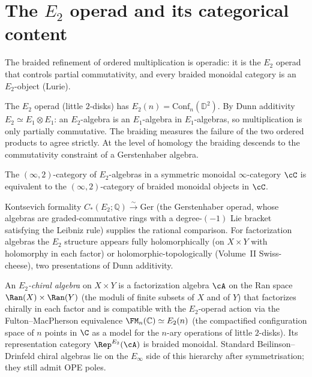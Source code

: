 \section{The \texorpdfstring{$E_2$}{E-2} operad and its categorical content}
\label{sec:e2-operad}

The braided refinement of ordered multiplication is operadic: it is
the $E_2$ operad that controls partial commutativity, and every
braided monoidal category is an $E_2$-object (Lurie).

\begin{definition}
\label{def:e2-operad}
The $E_2$ operad (little $2$-disks) has $E_2(n) =
\mathrm{Conf}_n(\mathbb{D}^2)$. By Dunn additivity $E_2 \simeq E_1
\otimes E_1$: an $E_2$-algebra is an $E_1$-algebra in $E_1$-algebras,
so multiplication is only partially commutative. The braiding measures
the failure of the two ordered products to agree strictly. At the level
of homology the braiding descends to the
commutativity constraint of a Gerstenhaber algebra.
\end{definition}

\begin{theorem}
\label{thm:lurie-e2-braided}
\ClaimStatusProvedElsewhere
The $(\infty,2)$-category of $E_2$-algebras in a symmetric monoidal
$\infty$-category $\cC$ is equivalent to the $(\infty,2)$-category of
braided monoidal objects in $\cC$.
\end{theorem}

Kontsevich formality $C_*(E_2;\mathbb{Q}) \xrightarrow{\sim}
\mathrm{Ger}$ \textup{(}the Gerstenhaber operad, whose algebras are
graded-commutative rings with a degree-$(-1)$ Lie bracket satisfying
the Leibniz rule\textup{)} supplies the rational comparison.
For factorization algebras the $E_2$ structure appears fully
holomorphically \textup{(}on $X \times Y$ with holomorphy in each
factor\textup{)} or holomorphic-topologically \textup{(}Volume~II
Swiss-cheese\textup{),} two presentations of Dunn additivity.

\begin{definition}
\label{def:e2-chiral-algebra}
An \emph{$E_2$-chiral algebra} on $X \times Y$ is a factorization
algebra $\cA$ on the Ran space $\Ran(X) \times \Ran(Y)$
\textup{(}the moduli of finite subsets of $X$ and of $Y$\textup{)}
that factorizes chirally in each factor and is compatible with the
$E_2$-operad action via the Fulton--MacPherson equivalence
$\FM_n(\mathbb{C}) \simeq E_2(n)$ \textup{(}the compactified
configuration space of $n$ points in $\C$ as a model for the $n$-ary
operations of little $2$-disks\textup{).} Its representation category
$\Rep^{E_2}(\cA)$ is braided monoidal. Standard Beilinson--Drinfeld
chiral algebras lie on the $E_\infty$ side of this hierarchy after
symmetrisation; they still admit OPE poles.
\end{definition}

